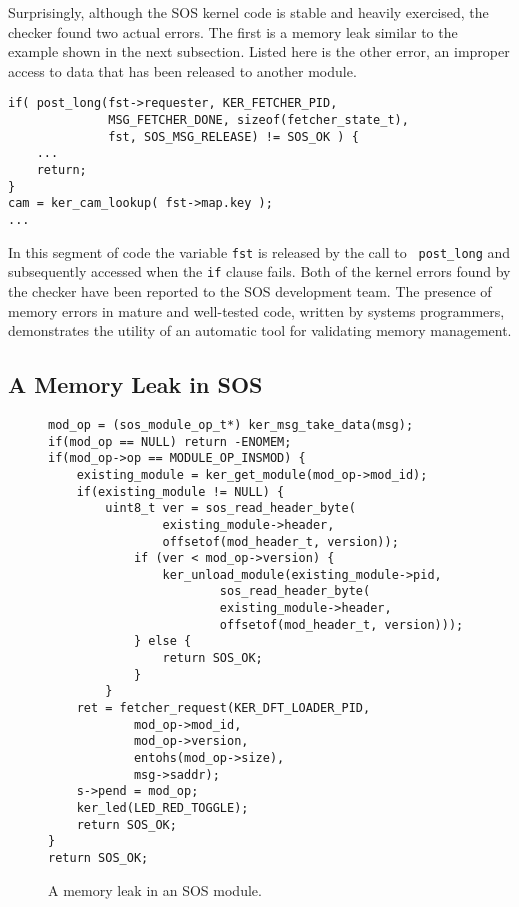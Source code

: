 Surprisingly,
although the SOS kernel code is stable and heavily exercised, the checker found
two actual errors.
The first is a memory leak similar to the example shown in the next
subsection.
Listed here is the other error, an improper access to data that has been released to
another module.
%
\begin{footnotesize}
\begin{verbatim}
if( post_long(fst->requester, KER_FETCHER_PID,
              MSG_FETCHER_DONE, sizeof(fetcher_state_t),
              fst, SOS_MSG_RELEASE) != SOS_OK ) {
    ...
    return;
}
cam = ker_cam_lookup( fst->map.key );
...
\end{verbatim}
\end{footnotesize}
%
In this segment of code the variable {\tt fst} is released by the call to {\tt
post\_long} and subsequently accessed when the {\tt if} clause fails.
Both of
the kernel errors found by the checker
have been reported to the SOS development team.
The presence of memory errors in mature and well-tested code, written by systems
programmers, demonstrates the utility of an automatic tool for
validating memory management.




\subsection{A Memory Leak in SOS}
\label{ss:tale}

\begin{figure}[tp]
\begin{footnotesize}
\begin{verbatim}
mod_op = (sos_module_op_t*) ker_msg_take_data(msg);
if(mod_op == NULL) return -ENOMEM;
if(mod_op->op == MODULE_OP_INSMOD) {
    existing_module = ker_get_module(mod_op->mod_id);
    if(existing_module != NULL) {
        uint8_t ver = sos_read_header_byte(
                existing_module->header,
                offsetof(mod_header_t, version));
            if (ver < mod_op->version) {
                ker_unload_module(existing_module->pid, 
                        sos_read_header_byte(
                        existing_module->header,
                        offsetof(mod_header_t, version)));
            } else {
                return SOS_OK;
            }
        }
    ret = fetcher_request(KER_DFT_LOADER_PID,
            mod_op->mod_id,
            mod_op->version,
            entohs(mod_op->size),
            msg->saddr);
    s->pend = mod_op;
    ker_led(LED_RED_TOGGLE);
    return SOS_OK;
}
return SOS_OK;
\end{verbatim}
\end{footnotesize}
\label{fig:leak}
\caption{A memory leak in an SOS module.}
\end{figure}


